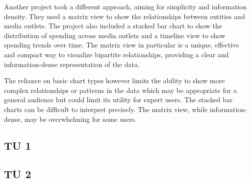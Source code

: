 \documentclass{vgtc}                          %
\begin{document}
\medskip

Another project \cite{univie07} took a different approach, aiming for simplicity and information density. 
They used a matrix view to show the relationships between entities and media outlets. The project also included a stacked bar chart to show the distribution of spending across media outlets and a timeline view to show spending trends over time. The matrix view in particular is a unique, effective and compact way to visualize bipartite relationships, providing a clear and information-dense representation of the data.

The reliance on basic chart types however limits the ability to show more complex relationships or patterns in the data which may be appropriate for a general audience but could limit its utility for expert users. The stacked bar charts can be difficult to interpret precisely. The matrix view, while information-dense, may be overwhelming for some users.

\subsection{TU 1}

\subsection{TU 2}



















\end{document}
